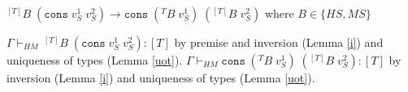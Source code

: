 \begin{case}
$^{[T]}B\;(\mathtt{cons}\;v_{S}^{1}\;v_{S}^{2})\rightarrow\mathtt{cons}\;(^{T}B\;v_{S}^{1})\;(^{[T]}B\;v_{S}^{2})$ where $B\in\lbrace HS,MS\rbrace$

$\Gamma\vdash_{HM}\,^{[T]}B\;(\mathtt{cons}\;v_{S}^{1}\;v_{S}^{2}):[T]$ by premise and inversion (Lemma \ref{i}) and uniqueness of types (Lemma \ref{uot}).  $\Gamma\vdash_{HM}\mathtt{cons}\;(^{T}B\;v_{S}^{1})\;(^{[T]}B\;v_{S}^{2}):[T]$ by inversion (Lemma \ref{i}) and uniqueness of types (Lemma \ref{uot}).
\end{case}